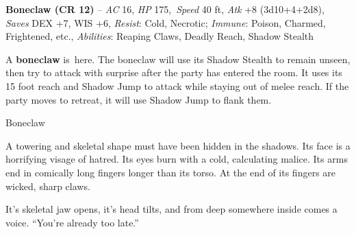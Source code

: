 \documentclass[10pt,twocolumn]{article}
\let\oldtextbf\textbf
\renewcommand{\textbf}[1]{\oldtextbf{{#1}}}
\renewenvironment{quote}
  {%
    \begingroup
      \setlength{\parindent}{1em}%
      \setlength{\parskip}{0pt}%
      \begin{tcolorbox}[myquote,
        before upper={%
          \let\textbf\oldtextbf
          \setlength{\parindent}{1.5em}%
          \setlength{\parskip}{0pt}%
          \noindent              %
        }%
      ]%
  }
  {%
      \end{tcolorbox}%
    \endgroup
  }
\begin{document}
\begin{tcolorbox}[
  enhanced,
  breakable,
  colback={encountercolor},
  colframe=black,
  boxrule=1pt,
  coltext=black,
  arc=6pt,
  left=4pt,
  right=4pt,
  top=2pt,
  bottom=2pt,
  boxsep=4pt,
  before skip=10pt,
  after skip=10pt,
  fontupper={\blockquoteFont\small\linespread{0.9}\selectfont\color{black}}
]

\faSkull\hspace{0.8em}\begin{minipage}[t]{\dimexpr\linewidth-1.8em\hangindent=1.8em\hangafter=0}\textbf{Boneclaw
(CR 12)} -- \emph{AC} 16, \emph{HP} 175,~\emph{Speed} 40 ft, \emph{Atk}
+8 (3d10+4+2d8), \emph{Saves} DEX +7, WIS +6, \emph{Resist}: Cold,
Necrotic; \emph{Immune}: Poison, Charmed, Frightened, etc.,
\emph{Abilities}: Reaping Claws, Deadly Reach, Shadow Stealth

\end{minipage}\end{tcolorbox}

A \textbf{boneclaw} is~here. The boneclaw will use its Shadow Stealth to
remain unseen, then try to attack with surprise after the party has
entered the room. It uses its 15 foot reach and Shadow Jump to attack
while staying out of melee reach. If the party moves to retreat, it will
use Shadow Jump to flank them.

\begin{tcolorbox}[
  colback={imagecolor},
  coltext=black,
  colframe=black,
  boxrule=1pt,
  arc=6pt,
  left=4pt,
  right=4pt,
  top=2pt,
  bottom=2pt,
  boxsep=4pt,
  before skip=10pt,
  after skip=10pt,
  fontupper={\blockquoteFont\small\linespread{0.9}\selectfont\color{black}}
]

\faPhotoVideo\hspace{0.8em}\begin{minipage}[t]{\dimexpr\linewidth-1.8em\hangindent=1.8em\hangafter=0}Boneclaw

\end{minipage}\end{tcolorbox}

\begin{quote}
A towering and skeletal shape must have been hidden in the shadows. Its
face is a horrifying visage of hatred. Its eyes burn with a cold,
calculating malice. Its arms end in comically long fingers longer than
its torso. At the end of its fingers are wicked, sharp claws.

It's skeletal jaw opens, it's head tilts, and from deep somewhere inside
comes a voice. ``You're already too late.''
\end{quote}
\end{document}
